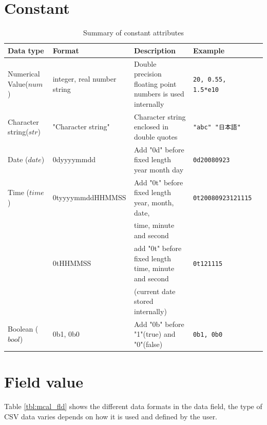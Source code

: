 \section{Constant}
\begin{table}[!hb]
\begin{center}
\caption{Summary of constant attributes }
{\small
  \begin{tabular}{l|l|p{5cm}l|l} \hline
Data type&Format&Description&Example\\ \hline
Numerical Value($num$)   & integer, real number string& Double precision floating point numbers is used internally            & \verb|20, 0.55, 1.5*e10|\\
Character string($str$) & "Character string"         & Character string enclosed in double quotes         & \verb|"abc" "日本語"|\\
Date ($date$)  & 0dyyyymmdd       & Add "0d" before fixed length year month day                 & \verb|0d20080923| \\
Time ($time$)  & 0tyyyymmddHHMMSS & Add "0t" before fixed length year, month, date,          & \verb|0t20080923121115|\\
		& & time, minute and second & \\
              & 0tHHMMSS         & add "0t" before fixed length time, minute and second              & \verb|0t121115|\\
              &                  & (current date stored internally)              & \\
Boolean ($bool$)  & 0b1, 0b0         & Add "0b" before "1"(true) and "0"(false) & \verb|0b1, 0b0| \\

\hline
  \end{tabular}
  }
  \end{center}
\end{table}


\section{Field value}
 Table \ref{tbl:mcal_fld} shows the different data formats in the data field, the type of CSV data varies depends on how it is used and defined by the user.

